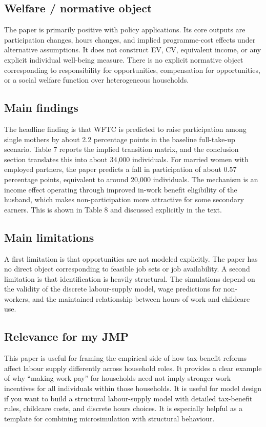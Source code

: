 \documentclass[11pt,a4paper]{article}
\begin{document}
\subsection*{Welfare / normative object}
The paper is primarily positive with policy applications. Its core outputs are participation changes, hours changes, and implied programme-cost effects under alternative assumptions. It does not construct EV, CV, equivalent income, or any explicit individual well-being measure. There is no explicit normative object corresponding to responsibility for opportunities, compensation for opportunities, or a social welfare function over heterogeneous households.

\subsection*{Main findings}
The headline finding is that WFTC is predicted to raise participation among single mothers by about 2.2 percentage points in the baseline full-take-up scenario. Table 7 reports the implied transition matrix, and the conclusion section translates this into about 34,000 individuals. For married women with employed partners, the paper predicts a fall in participation of about 0.57 percentage points, equivalent to around 20,000 individuals. The mechanism is an income effect operating through improved in-work benefit eligibility of the husband, which makes non-participation more attractive for some secondary earners. This is shown in Table 8 and discussed explicitly in the text.

\subsection*{Main limitations}
A first limitation is that opportunities are not modeled explicitly. The paper has no direct object corresponding to feasible job sets or job availability. A second limitation is that identification is heavily structural. The simulations depend on the validity of the discrete labour-supply model, wage predictions for non-workers, and the maintained relationship between hours of work and childcare use.

\subsection*{Relevance for my JMP}
This paper is useful for framing the empirical side of how tax-benefit reforms affect labour supply differently across household roles. It provides a clear example of why “making work pay” for households need not imply stronger work incentives for all individuals within those households. It is useful for model design if you want to build a structural labour-supply model with detailed tax-benefit rules, childcare costs, and discrete hours choices. It is especially helpful as a template for combining microsimulation with structural behaviour.
\end{document}
